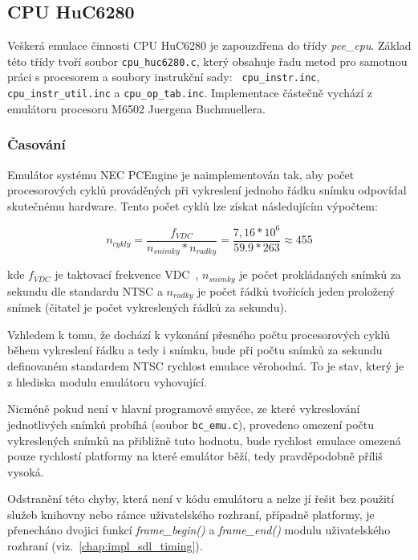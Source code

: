 %
%

\subsection{CPU HuC6280}

Veškerá emulace činnosti CPU HuC6280 je zapouzdřena do třídy {\em pce\_cpu}.
Základ této třídy tvoří soubor {\tt cpu\_huc6280.c}, který obsahuje řadu metod
pro samotnou práci s procesorem a soubory instrukční sady: {\tt
cpu\_instr.inc}, {\tt cpu\_instr\_util.inc} a {\tt cpu\_op\_tab.inc}.
Implementace částečně vychází z emulátoru procesoru M6502 Juergena
Buchmuellera.


\subsubsection{Časování}\label{chap:impl_pce_cpu_timing}

Emulátor systému NEC PCEngine je naimplementován tak, aby počet procesorových
cyklů prováděných při vykreslení jednoho řádku snímku odpovídal skutečnému
hardware. Tento počet cyklů lze získat následujícím výpočtem:

$$ n_{cykly} = \frac{f_{VDC}}{n_{snimky} * n_{radky}} = 
	\frac{7,16 * 10^6}{59.9 * 263} \approx 455 $$

kde $f_{VDC}$ je taktovací frekvence VDC~\cite{Schleussinger98}, $n_{snimky}$
je počet prokládaných snímků za sekundu dle standardu NTSC a $n_{radky}$ je
počet řádků tvořících jeden proložený snímek (čitatel je počet vykreslených
řádků za sekundu).

Vzhledem k tomu, že dochází k vykonání přesného počtu procesorových cyklů během
vykreslení řádku a tedy i snímku, bude při počtu snímků za sekundu definovaném
standardem NTSC rychlost emulace věrohodná. To je stav, který je z hlediska
modulu emulátoru vyhovující.

Nicméně pokud není v hlavní programové smyčce, ze které vykreslování
jednotlivých snímků probíhá (soubor {\tt bc\_emu.c}), provedeno omezení počtu
vykreslených snímků na přibližně tuto hodnotu, bude rychlost emulace omezená
pouze rychlostí platformy na které emulátor běží, tedy pravděpodobně příliš
vysoká.

Odstranění této chyby, která není v kódu emulátoru a nelze jí řešit bez použití
služeb knihovny nebo rámce uživatelského rozhraní, případně platformy, je
přenecháno dvojici funkcí {\em frame\_begin()} a {\em frame\_end()} modulu
uživatelského rozhraní (viz.~\ref{chap:impl_sdl_timing}).

